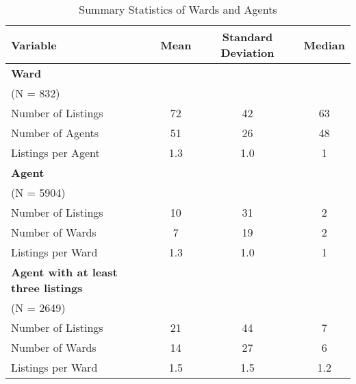 \documentclass[12pt]{article}
\begin{document}
\begin{table}[ht]
    \centering
    \caption{Summary Statistics of Wards and Agents}
    \begin{tabular}{@{}lccc@{}} \toprule
        Variable                    & Mean  & Standard Deviation    & Median \\ \midrule \addlinespace
        \bf{Ward} \\\cmidrule(r{2cm}){1-1}
        (N = 832) \\
        Number of Listings          & 72    & 42                    & 63 \\
        Number of Agents            & 51    & 26                    & 48 \\
        Listings per Agent          & 1.3   & 1.0                   & 1  \\ \addlinespace
        \bf{Agent} \\\cmidrule(r{2cm}){1-1}
        (N = 5904) \\
        Number of Listings          & 10    & 31                    & 2 \\
        Number of Wards             & 7     & 19                    & 2 \\
        Listings per Ward           & 1.3   & 1.0                   & 1 \\ \addlinespace
        \bf{Agent with at least three listings} \\\cmidrule(r{2cm}){1-1}
        (N = 2649) \\
        Number of Listings          & 21    & 44                    & 7 \\
        Number of Wards             & 14    & 27                    & 6 \\
        Listings per Ward           & 1.5   & 1.5                   & 1.2 \\ \bottomrule
    \end{tabular}
\end{table}
\end{document}

